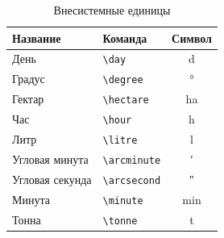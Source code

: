 \begin{table}
    \centering
    \begin{threeparttable}%
        \caption{Внесистемные единицы}\label{tab:unit:accepted}

        \begin{tabular}{llc}
            \toprule
            Название        & Команда           & Символ          \\
            \midrule
            День            & \verb|\day|       & \si{\day}       \\
            Градус          & \verb|\degree|    & \si{\degree}    \\
            Гектар          & \verb|\hectare|   & \si{\hectare}   \\
            Час             & \verb|\hour|      & \si{\hour}      \\
            Литр            & \verb|\litre|     & \si{\litre}     \\
            Угловая минута  & \verb|\arcminute| & \si{\arcminute} \\
            Угловая секунда & \verb|\arcsecond| & \si{\arcsecond} \\ %
            Минута          & \verb|\minute|    & \si{\minute}    \\
            Тонна           & \verb|\tonne|     & \si{\tonne}     \\
            \bottomrule
        \end{tabular}
    \end{threeparttable}
\end{table}

